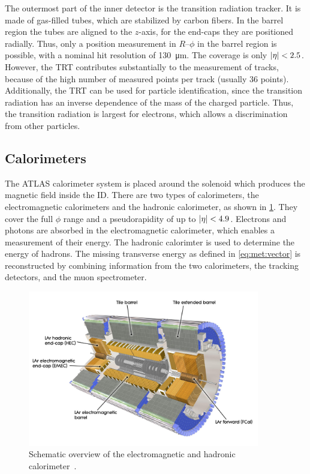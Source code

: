 The outermost part of the inner detector is the transition radiation tracker.
It is made of gas-filled tubes, which are stabilized by carbon fibers.
In the barrel region the tubes are aligned to the $z$-axis, for the end-caps they are positioned radially.
Thus, only a position measurement in $R$\nobreakdash--$\phi$ in the barrel region is possible, with a
nominal hit resolution of \SI{130}{\um}.
The coverage is only $\left|\eta\right| < 2.5$.
However, the TRT contributes substantially to the measurement of tracks, because of the high number of
measured points per track (usually 36 points).
Additionally, the TRT can be used for particle identification, since the transition radiation has
an inverse dependence of the mass of the charged particle.
Thus, the transition radiation is largest for electrons, which allows a discrimination from other particles.


\subsection{Calorimeters}\label{sub:setup:calorimeters}

The ATLAS calorimeter system is placed around the solenoid which produces the magnetic field inside the ID\@.
There are two types of calorimeters, the electromagnetic calorimeters and the hadronic calorimeter,
as shown in \cref{fig:setup:calo}.
They cover the full $\phi$ range and a pseudorapidity of up to $\left|\eta\right| < 4.9$.
Electrons and photons are absorbed in the electromagnetic calorimeter, which enables a measurement of their energy.
The hadronic calorimter is used to determine the energy of hadrons.
The missing transverse energy as defined in \cref{eq:met:vector} is reconstructed by combining information from the two
calorimeters, the tracking detectors, and the muon spectrometer.

\begin{figure}[htb]
    \centering
    \includegraphics[width=0.9\textwidth]{./figures/setup/calorimeters.jpg}
    \caption{Schematic overview of the electromagnetic and hadronic calorimeter~\cite{ATLAS}.}\label{fig:setup:calo}
\end{figure}

